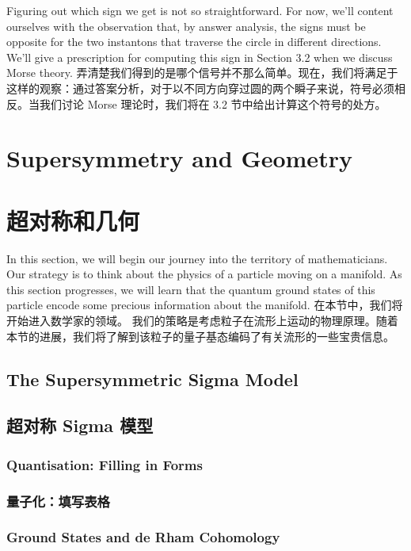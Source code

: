 \documentclass{article}
\begin{document}
\begin{paracol}{2}
Figuring out which sign we get is not so straightforward. For now, we’ll content ourselves with the observation that, by answer analysis, the signs must be opposite for the two instantons that traverse the circle in diﬀerent directions. We’ll give a prescription for computing this sign in Section 3.2 when we discuss Morse theory.
\switchcolumn
弄清楚我们得到的是哪个信号并不那么简单。现在，我们将满足于这样的观察：通过答案分析，对于以不同方向穿过圆的两个瞬子来说，符号必须相反。当我们讨论 Morse 理论时，我们将在 3.2 节中给出计算这个符号的处方。
\switchcolumn*

\section{Supersymmetry and Geometry}
\switchcolumn
\section*{超对称和几何}
\switchcolumn*

In this section, we will begin our journey into the territory of mathematicians. Our strategy is to think about the physics of a particle moving on a manifold. As this section progresses, we will learn that the quantum ground states of this particle encode some precious information about the manifold.
\switchcolumn
在本节中，我们将开始进入数学家的领域。 我们的策略是考虑粒子在流形上运动的物理原理。随着本节的进展，我们将了解到该粒子的量子基态编码了有关流形的一些宝贵信息。
\switchcolumn*

\subsection{The Supersymmetric Sigma Model}
\switchcolumn
\subsection*{超对称 Sigma 模型}
\switchcolumn*

\subsubsection{Quantisation: Filling in Forms}
\switchcolumn
\subsubsection*{量子化：填写表格}
\switchcolumn*

\subsubsection{Ground States and de Rham Cohomology}
\switchcolumn

\end{paracol}
\end{document}
